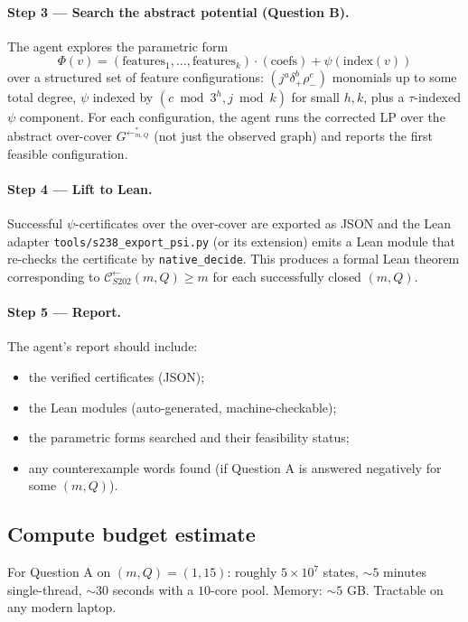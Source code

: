 \documentclass[11pt,a4paper]{article}
\theoremstyle{plain}
\theoremstyle{definition}
\newcommand{\Cback}{\mathcal{C}^{\!\leftarrow}_{S202}}
\newcommand{\InvG}{G^{\!\leftarrow}}
\begin{document}
\paragraph{Step 3 — Search the abstract potential (Question B).}
The agent explores the parametric form
\[
   \Phi(v) = (\text{features}_1, \ldots, \text{features}_k)
            \cdot (\text{coefs}) + \psi(\text{index}(v))
\]
over a structured set of feature configurations: $(j^a \delta_+^b
\rho_-^c)$ monomials up to some total degree, $\psi$ indexed by
$(c \bmod 3^h, j \bmod k)$ for small $h, k$, plus a $\tau$-indexed
$\psi$ component. For each configuration, the agent runs the
corrected LP over the abstract over-cover $\InvG^{*}_{m, Q}$ (not
just the observed graph) and reports the first feasible
configuration.

\paragraph{Step 4 — Lift to Lean.}
Successful $\psi$-certificates over the over-cover are exported as
JSON and the Lean adapter
\texttt{tools/s238\_export\_psi.py} (or its extension) emits a
Lean module that re-checks the certificate by \texttt{native\_decide}.
This produces a formal Lean theorem corresponding to
$\Cback(m, Q) \ge m$ for each successfully closed $(m, Q)$.

\paragraph{Step 5 — Report.}
The agent's report should include:
\begin{itemize}
   \item the verified certificates (JSON);
   \item the Lean modules (auto-generated, machine-checkable);
   \item the parametric forms searched and their feasibility status;
   \item any counterexample words found (if Question A is
         answered negatively for some $(m, Q)$).
\end{itemize}

\subsection{Compute budget estimate}

For Question A on $(m, Q) = (1, 15)$: roughly $5 \times 10^7$
states, $\sim 5$ minutes single-thread, $\sim 30$ seconds with a
$10$-core pool. Memory: $\sim 5$ GB. Tractable on any modern
laptop.
\end{document}
